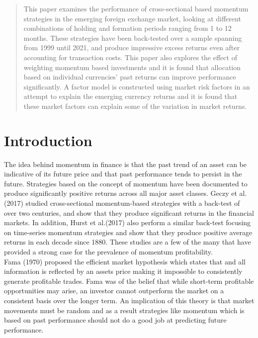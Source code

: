 \documentclass{article}
\begin{document}
\maketitle
\begin{abstract}
    This paper examines the performance of cross-sectional based momentum strategies in the emerging foreign exchange market, looking at different combinations of holding and formation periods ranging from 1 to 12 months. These strategies have been back-tested over a sample spanning from 1999 until 2021, and produce impressive excess returns even after accounting for transaction costs. This paper also explores the effect of weighting momentum based investments and it is found that allocation based on individual currencies' past returns can improve performance significantly. A factor model is constructed using market risk factors in an attempt to explain the emerging currency returns and it is found that these market factors can explain some of the variation in market returns.
\end{abstract}
\newpage
\tableofcontents
\newpage
\section{Introduction}
 
 The idea behind momentum in finance is that the past trend of an asset can be indicative of its future price and that past performance tends to persist in the future. Strategies based on the concept of momentum have been documented to produce significantly positive returns across all major asset classes. Geczy et al.(2017) studied cross-sectional momentum-based strategies with a back-test of over two centuries, and show that they produce significant returns in the financial markets. In addition, Hurst et al.(2017) also perform a similar back-test focusing on time-series momentum strategies and show that they produce positive average returns in each decade since 1880. These studies are a few of the many that have provided a strong case for the prevalence of momentum profitability.\\
 
 
 
 Fama (1970) proposed the efficient market hypothesis which states that and all information is reflected by an assets price making it impossible to consistently generate profitable trades. Fama was of the belief that while short-term profitable opportunities may arise, an investor cannot outperform the market on a consistent basis over the longer term.  An implication of this theory is that market movements must be random and as a result strategies like momentum which is based on past performance should not do a good job at predicting future performance. \\
 
\end{document}
